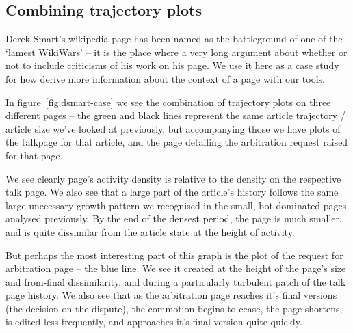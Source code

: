 \subsection*{Combining trajectory plots}
Derek Smart's wikipedia page has been named as the battleground of one
of the `lamest WikiWars' -- it is the place where a very long argument
about whether or not to include criticisms of his work on his page.
We use it here as a case study for how derive more information about
the context of a page with our tools.

In figure~\ref{fig:dsmart-case} we see the combination of trajectory
plots on three different pages -- the green and black lines represent
the same article trajectory / article size we've looked at previously,
but accompanying those we have plots of the talkpage for that article,
and the page detailing the arbitration request raised for that page. 

We see clearly page's activity density is relative to the density on
the respective talk page. We also see that a large part of the
article's history follows the same large-unecessary-growth pattern we
recognised in the small, bot-dominated pages analysed previously. By
the end of the densest period, the page is much smaller, and is
quite dissimilar from the article state at the height of activity.

But perhaps the most interesting part of this graph is the plot of the
request for arbitration page -- the blue line. We see it created at
the height of the page's size and from-final dissimilarity, and during
a particularly turbulent patch of the talk page history. We also see
that as the arbitration page reaches it's final versions (the decision
on the dispute), the commotion begins to cease, the page
shortens, is edited less frequently, and approaches it's final version
quite quickly.

